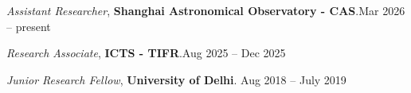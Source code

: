 \begin{itemize}[label={}, leftmargin=0pt]
    {
    \item \emph{Assistant Researcher}, {\bf Shanghai Astronomical Observatory - CAS}.\hfill Mar 2026 -- present
    \item \emph{Research Associate}, {\bf ICTS - TIFR}.\hfill Aug 2025 -- Dec 2025
    \item \emph{Junior Research Fellow}, {\bf University of Delhi}. \hfill Aug 2018 -- July 2019%


    }
\end{itemize}